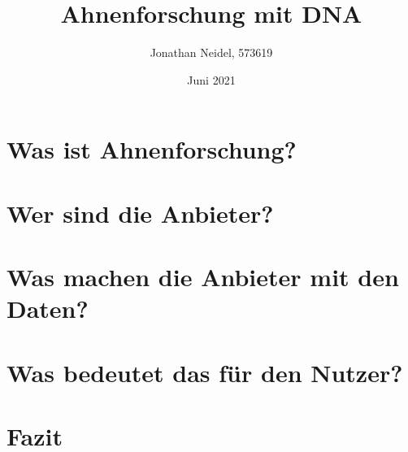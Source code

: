 \documentclass{beamer}
\title{Ahnenforschung mit DNA}
\subtitle{}
\author{Jonathan Neidel, 573619}
\date{Juni 2021}
\institute{HTW Berlin, Angewandte Informatik, Datenschutz und Datensicherheit}
\begin{document}
\frame{\titlepage}

\section{Was ist Ahnenforschung?}
\section{Wer sind die Anbieter?}
\section{Was machen die Anbieter mit den Daten?}
\section{Was bedeutet das für den Nutzer?}
\section{Fazit}
\end{document}
